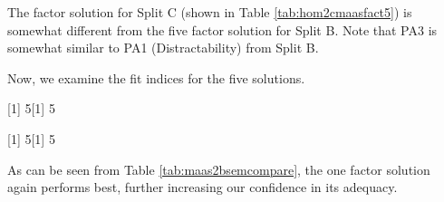 \documentclass{article}
\begin{document}
The factor solution for Split C (shown in Table \ref{tab:hom2cmaasfact5}) is somewhat different from the five factor solution for Split B. Note that PA3 is somewhat similar to PA1 (Distractability) from Split B. 

Now, we examine the fit indices for the five solutions.

[1] 5[1] 5%
\begin{table}[ht]
\centering
{}
\caption{ Comparison of Fit Indices for MAAS Factor Solutions, Sample Two Split B} 
\label{tab:hom2bmaassemcomp}
\end{table}

[1] 5[1] 5%
\begin{table}[ht]
\centering
{}
\caption{ Comparison of Fit Indices for MAAS Factor Solutions, Sample Two Split B} 
\label{tab:hom2cmaassemcomp}
\end{table}








\begin{table}[ht]
\centering
{}
\caption{Comparison of Factor Structures for MAAS 2B Solutions, Tested on Split C} 
\label{tab:maas2bsemcompare}
\end{table}
As can be seen from Table \ref{tab:maas2bsemcompare}, the one factor solution again performs best, further increasing our confidence in its adequacy.
\end{document}
